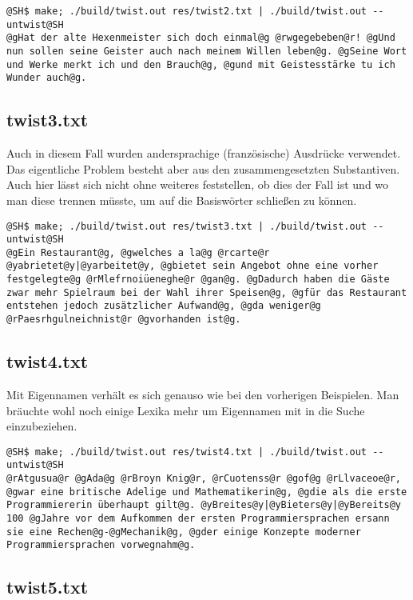 \documentclass[a4paper,10pt,ngerman]{scrartcl}
\begin{document}
\begin{lstlisting}
@SH$ make; ./build/twist.out res/twist2.txt | ./build/twist.out --untwist@SH
@gHat der alte Hexenmeister sich doch einmal@g @rwgegebeben@r! @gUnd nun sollen seine Geister auch nach meinem Willen leben@g. @gSeine Wort und Werke merkt ich und den Brauch@g, @gund mit Geistesstärke tu ich Wunder auch@g.
\end{lstlisting}

\subsection{twist3.txt}
Auch in diesem Fall wurden andersprachige (französische) Ausdrücke verwendet. Das eigentliche Problem besteht aber aus den zusammengesetzten Substantiven. Auch hier lässt sich nicht ohne weiteres feststellen, ob dies der Fall ist und wo man diese trennen müsste, um auf die Basiswörter schließen zu können.

\begin{lstlisting}
@SH$ make; ./build/twist.out res/twist3.txt | ./build/twist.out --untwist@SH
@gEin Restaurant@g, @gwelches a la@g @rcarte@r @yabrietet@y|@yarbeitet@y, @gbietet sein Angebot ohne eine vorher festgelegte@g @rMlefrnoiüeneghe@r @gan@g. @gDadurch haben die Gäste zwar mehr Spielraum bei der Wahl ihrer Speisen@g, @gfür das Restaurant entstehen jedoch zusätzlicher Aufwand@g, @gda weniger@g @rPaesrhgulneichnist@r @gvorhanden ist@g.
\end{lstlisting}

\subsection{twist4.txt}
Mit Eigennamen verhält es sich genauso wie bei den vorherigen Beispielen. Man bräuchte wohl noch einige Lexika mehr um Eigennamen mit in die Suche einzubeziehen.

\begin{lstlisting}
@SH$ make; ./build/twist.out res/twist4.txt | ./build/twist.out --untwist@SH
@rAtgusua@r @gAda@g @rBroyn Knig@r, @rCuotenss@r @gof@g @rLlvaceoe@r, @gwar eine britische Adelige und Mathematikerin@g, @gdie als die erste Programmiererin überhaupt gilt@g. @yBreites@y|@yBieters@y|@yBereits@y 100 @gJahre vor dem Aufkommen der ersten Programmiersprachen ersann sie eine Rechen@g-@gMechanik@g, @gder einige Konzepte moderner Programmiersprachen vorwegnahm@g.
\end{lstlisting}

\subsection{twist5.txt}
\end{document}
